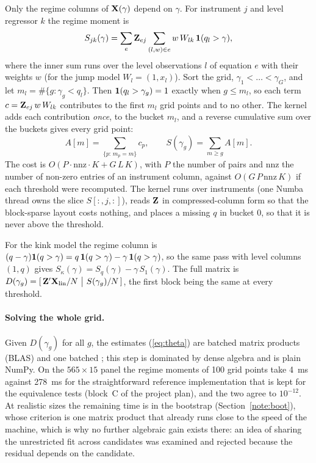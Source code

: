 Only the regime columns of $\mathbf{X}(\gamma)$ depend on $\gamma$. For instrument $j$ and level regressor
$k$ the regime moment is
\begin{equation}\label{eq:S}
S_{jk}(\gamma)=\sum_{e}\mathbf{Z}_{ej}\sum_{(l,w)\in e} w\,W_{lk}\,\mathbf{1}(q_l>\gamma),
\end{equation}
where the inner sum runs over the level observations $l$ of equation $e$ with their weights $w$
(for the jump model $W_l=(1,x_l)$). Sort the grid, $\gamma_1<\dots<\gamma_G$, and let
$m_l=\#\{g:\gamma_g<q_l\}$. Then $\mathbf{1}(q_l>\gamma_g)=1$ exactly when $g\le m_l$, so each term
$c=\mathbf{Z}_{ej}\,w\,W_{lk}$ contributes to the first $m_l$ grid points and to no other. The kernel adds
each contribution \emph{once}, to the bucket $m_l$, and a reverse cumulative sum over the buckets
gives every grid point:
\begin{equation}\label{eq:cumsum}
A[m]=\sum_{\{p:\,m_p=m\}}c_p,\qquad S(\gamma_g)=\sum_{m\ge g}A[m].
\end{equation}
The cost is $O(P\cdot\mathrm{nnz}\cdot K+G\,L\,K)$, with $P$ the number of pairs and $\mathrm{nnz}$
the number of non-zero entries of an instrument column, against $O(G\,P\,\mathrm{nnz}\,K)$ if each
threshold were recomputed. The kernel runs over instruments (one Numba thread owns the slice
$S[:,j,:]$), reads $\mathbf{Z}$ in compressed-column form so that the block-sparse layout costs nothing, and
places a missing $q$ in bucket 0, so that it is never above the threshold.

For the kink model the regime column is $(q-\gamma)\mathbf{1}(q>\gamma)=q\,\mathbf{1}(q>\gamma)-\gamma\,\mathbf{1}(q>\gamma)$,
so the same pass with level columns $(1,q)$ gives $S_\kappa(\gamma)=S_q(\gamma)-\gamma\,S_1(\gamma)$.
The full matrix is $D(\gamma_g)=[\,\bZ'\bX_{\text{lin}}/N\ \big|\ S(\gamma_g)/N\,]$, the first block
being the same at every threshold.

\paragraph{Solving the whole grid.} Given $D(\gamma_g)$ for all $g$, the estimates (\ref{eq:theta}) are
batched matrix products (BLAS) and one batched ; this step is dominated by dense algebra
and is plain NumPy. On the $565\times15$ panel the regime moments of 100 grid points take 4~ms
against 278~ms for the straightforward reference implementation that is kept for the equivalence
tests (block~C of the project plan), and the two agree to $10^{-12}$. At realistic sizes the
remaining time is in the bootstrap (Section~\ref{note:boot}), whose criterion is one matrix product
that already runs close to the speed of the machine, which is why no further algebraic gain exists
there: an idea of sharing the unrestricted fit across candidates was examined and rejected because the
residual depends on the candidate.

